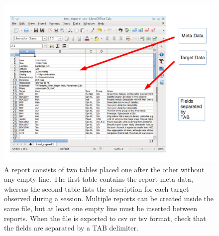 \begin{center}
\begin{figure}
\includegraphics[width=1.2\textwidth]{images/report_sample_annot}\par\vspace{1cm}
\caption[Report example]{A report consists of two tables placed one after the other without any empty line. The first table contains the report meta data, whereas the second table lists the description for each target observed during a session. Multiple reports can be created inside the same file, but at least one empty line must be inserted between reports. When the file is exported to csv or tsv format, check that the fields are separated by a TAB delimiter.}
\end{figure}
\end{center}


